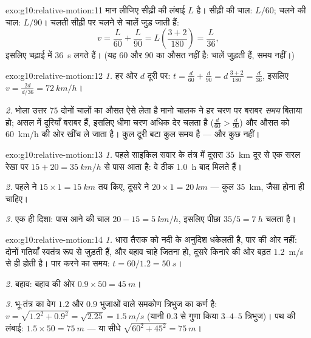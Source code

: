 \begin{solution}{exo:g10:relative-motion:11}
मान लीजिए सीढ़ी की लंबाई $L$ है। सीढ़ी की चाल: $L/60$; चलने की चाल:
$L/90$। चलती सीढ़ी पर चलने से चालें जुड़ जाती हैं:
\[
v = \frac{L}{60} + \frac{L}{90} = L\left(\frac{3 + 2}{180}\right)
= \frac{L}{36},
\]
इसलिए चढ़ाई में \qty{36}{s} लगते हैं। (यह $60$ और $90$ का औसत नहीं है:
चालें जुड़ती हैं, समय नहीं।)
\end{solution}

\begin{solution}{exo:g10:relative-motion:12}
\emph{1.} हर ओर $d$ दूरी पर:
$t = \frac{d}{60} + \frac{d}{90} = d\,\frac{3 + 2}{180} = \frac{d}{36}$,
इसलिए $v = \frac{2d}{d/36} = \qty{72}{km/h}$।

\emph{2.} भोला उत्तर $75$ दोनों चालों का औसत ऐसे लेता है मानो चालक ने
हर चरण पर बराबर \emph{समय} बिताया हो; असल में दूरियाँ बराबर हैं, इसलिए
धीमा चरण अधिक देर चलता है ($\frac{d}{60} > \frac{d}{90}$) और औसत को \qty{60}{km/h} की ओर खींच ले जाता
है।  कुल दूरी बटा कुल समय है --- और कुछ नहीं।
\end{solution}

\begin{solution}{exo:g10:relative-motion:13}
\emph{1.} पहले साइकिल सवार के तंत्र में दूसरा \qty{35}{km} दूर से एक सरल रेखा
पर $15 + 20 = \qty{35}{km/h}$ से पास आता है: वे ठीक \qty{1.0}{h} बाद मिलते हैं।

\emph{2.} पहले ने $15 \times 1 = \qty{15}{km}$ तय किए, दूसरे ने $20 \times 1 = \qty{20}{km}$ --- कुल \qty{35}{km}, जैसा
होना ही चाहिए।

\emph{3.} एक ही दिशा: पास आने की चाल $20 - 15 = \qty{5}{km/h}$, इसलिए पीछा $35/5 = \qty{7}{h}$ चलता है।
\end{solution}

\begin{solution}{exo:g10:relative-motion:14}
\emph{1.} धारा तैराक को नदी के अनुदिश धकेलती है, पार की ओर नहीं: दोनों
गतियाँ स्वतंत्र रूप से जुड़ती हैं, और बहाव चाहे जितना हो, दूसरे किनारे की
ओर बढ़त \qty{1.2}{m/s} से ही होती है। पार करने का समय: $t = 60/1.2 = \qty{50}{s}$।

\emph{2.} बहाव: बहाव की ओर $0.9 \times 50 = \qty{45}{m}$।

\emph{3.} भू-तंत्र का वेग $1.2$ और $0.9$ भुजाओं वाले समकोण त्रिभुज का
कर्ण है: $v = \sqrt{1.2^2 + 0.9^2} = \sqrt{2.25} = \qty{1.5}{m/s}$ (यानी $0.3$ से गुणा किया $3$--$4$--$5$
त्रिभुज)। पथ की लंबाई: $1.5 \times 50 = \qty{75}{m}$ --- या सीधे $\sqrt{60^2 + 45^2} = \qty{75}{m}$।
\end{solution}

